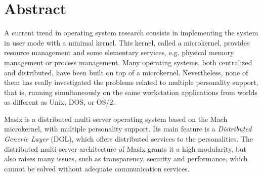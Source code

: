 
\setpapersizeUSletter




\newcommand {\figps} [4]
{
    \begin{figure} [ht]
       \begin{center}
                \texttt{[image: \#1.ps]}
        	\caption {#4}
        	\label {fig:#1}
        \end{center}
    \end{figure}
}




\IEEEheader

\section*{Abstract}

	A current trend in operating system research consists in implementing
	the system in user mode with a minimal kernel. This kernel, called a
	microkernel, provides resource management and some elementary 
	services, e.g. physical memory management or process management.
	Many operating systems, both centralized and distributed, 
	have been built on top of a microkernel.
	Nevertheless, none of them has really investigated the problems 
	related to multiple personality support, that is, running 
	simultaneously on the same workstation applications from worlds 
	as different as Unix, DOS, or OS/2.

        Masix is a distributed multi-server operating 
	system based on the Mach microkernel, with multiple personality 
	support. 
        Its main feature is a {\it Distributed Generic Layer} (DGL), 
        which offers distributed services to the personalities. 
        The distributed multi-server architecture of Masix  
        grants it a high modularity, but also raises many issues, 
	such as transparency, security and performance, which 
        cannot be solved without adequate communication services. 

